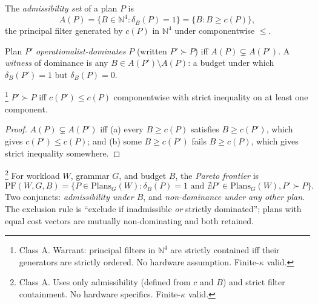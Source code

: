 \begin{definition}\label{def:admiss-set}
  The \emph{admissibility set} of a plan $P$ is
  \begin{equation*}
    A(P) = \{B \in \mathbb{N}^4 : \delta_B(P) = 1\}
         = \{B : B \geq c(P)\},
  \end{equation*}
  the principal filter generated by $c(P)$ in
  $\mathbb{N}^4$ under componentwise $\leq$.
\end{definition}

\begin{definition}
  \label{def:op-dominance}
  Plan $P'$ \emph{operationalist-dominates} $P$
  (written $P' \succ P$) iff $A(P) \subsetneq A(P')$.
  A \emph{witness} of dominance is any
  $B \in A(P') \setminus A(P)$: a budget under which
  $\delta_B(P') = 1$ but $\delta_B(P) = 0$.
\end{definition}

\begin{proposition}
  \label{prop:op-equals-pareto}
  \footnote{Class \textsf{A}. Warrant: principal
  filters in $\mathbb{N}^4$ are strictly contained iff
  their generators are strictly ordered. No hardware
  assumption. Finite-$\kappa$ valid.}
  $P' \succ P$ iff $c(P') \leq c(P)$ componentwise
  with strict inequality on at least one component.
\end{proposition}

\begin{proof}
  $A(P) \subsetneq A(P')$ iff (a) every $B \geq c(P)$
  satisfies $B \geq c(P')$, which gives $c(P') \leq
  c(P)$; and (b) some $B \geq c(P')$ fails $B \geq
  c(P)$, which gives strict inequality somewhere.
\end{proof}

\begin{proposition}
  \label{prop:frontier-char}
  \footnote{Class \textsf{A}. Uses only admissibility
  (defined from $c$ and $B$) and strict filter
  containment. No hardware specifics. Finite-$\kappa$
  valid.}
  For workload $W$, grammar $G$, and budget $B$, the
  \emph{Pareto frontier} is
  \begin{equation*}
    \mathrm{PF}(W, G, B) = \bigl\{P \in
      \mathrm{Plans}_G(W) : \delta_B(P) = 1 \text{ and } \nexists P' \in \mathrm{Plans}_G(W), P' \succ P\bigr\}.
  \end{equation*}
  Two conjuncts: \emph{admissibility under $B$}, and
  \emph{non-dominance under any other plan}. The
  exclusion rule is ``exclude if inadmissible
  \emph{or} strictly dominated''; plans with equal
  cost vectors are mutually non-dominating and both
  retained.
\end{proposition}

